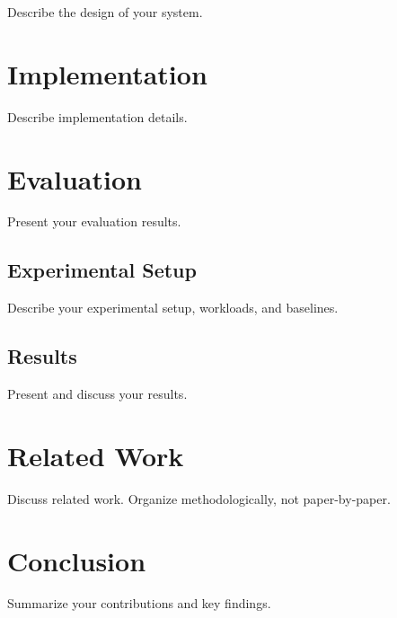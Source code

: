 \documentclass[letterpaper,twocolumn,10pt]{article}
\begin{document}
Describe the design of your system.

\section{Implementation}
\label{sec:implementation}

Describe implementation details.

\section{Evaluation}
\label{sec:evaluation}

Present your evaluation results.

\subsection{Experimental Setup}

Describe your experimental setup, workloads, and baselines.

\subsection{Results}

Present and discuss your results.

\section{Related Work}
\label{sec:related}

Discuss related work. Organize methodologically, not paper-by-paper.

\section{Conclusion}
\label{sec:conclusion}

Summarize your contributions and key findings.

{\footnotesize 
}
\end{document}
